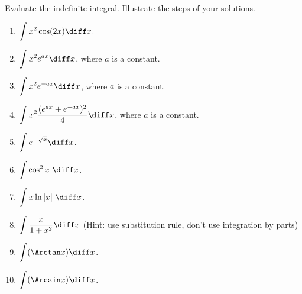Evaluate the indefinite integral. Illustrate the steps of your solutions.
\begin{multicols}{2}
\begin{enumerate}[ref={\fcProblemRef}]
\item $\displaystyle\int x^2\cos (2x) \diff x$.

\item 
$\displaystyle\int x^2e^{a x} \diff x$, where $a$ is a constant.

\item 
$\displaystyle\int x^2e^{-ax}\diff x$, where $a$ is a constant.

\item \label{problemintx^2(e^(ax)+e^(-ax))^2/4dx}
$\displaystyle\int x^2\frac{(e^{ax}+e^{-ax})^2}4\diff x$, where $a$ is a constant. 

\item \label{problemint(e^(-sqrtx)dx)}
$ \displaystyle 
\int e^{-\sqrt{x}}\diff x
$.

\item 
$\displaystyle\int \cos^2x ~ \diff x$.

\item 
$\displaystyle \int x\ln |x|  ~ \diff x $.

\item $\displaystyle\int \frac{x}{1+x^2} \diff x$  (Hint: use substitution rule, don't use integration by parts)

\item 
$\displaystyle \int (\Arctan x) \diff x$.

\item 
$\displaystyle \int (\Arcsin x) \diff x
$.


\end{enumerate}
\end{multicols}
